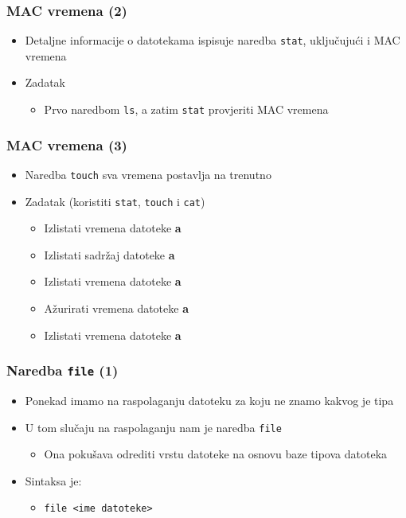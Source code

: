 \documentclass{beamer}
\newcommand{\shell}[1]{\texttt{#1}}
\begin{document}
\begin{frame}[t]
\frametitle{MAC vremena (2)}
\begin{itemize}
  \item Detaljne informacije o datotekama ispisuje naredba \shell{stat},
        uključujući i MAC vremena
  \item Zadatak
  \begin{itemize}
    \item Prvo naredbom \shell{ls}, a zatim \shell{stat} provjeriti MAC
          vremena
  \end{itemize}
\end{itemize}
\end{frame}

\begin{frame}[t]
\frametitle{MAC vremena (3)}
\begin{itemize}
  \item Naredba \shell{touch} sva vremena postavlja na trenutno
  \item Zadatak (koristiti \shell{stat}, \shell{touch} i \shell{cat}) 
  \begin{itemize}
    \item Izlistati vremena datoteke \textbf{a}
    \item Izlistati sadržaj datoteke \textbf{a}
    \item Izlistati vremena datoteke \textbf{a}
    \item Ažurirati vremena datoteke \textbf{a}
    \item Izlistati vremena datoteke \textbf{a}
  \end{itemize}
\end{itemize}
\end{frame}

\begin{frame}[t]
\frametitle{Naredba \shell{file} (1)}
\begin{itemize}
  \item Ponekad imamo na raspolaganju datoteku za koju ne znamo kakvog je
        tipa
  \item U tom slučaju na raspolaganju nam je naredba \shell{file}
  \begin{itemize}
    \item Ona pokušava odrediti vrstu datoteke na osnovu baze tipova 
          datoteka
  \end{itemize}
  \item Sintaksa je:
  \begin{itemize}
    \item[] \shell{file <ime datoteke>}
    \end{itemize}
\end{itemize}
\end{frame}  
\end{document}
